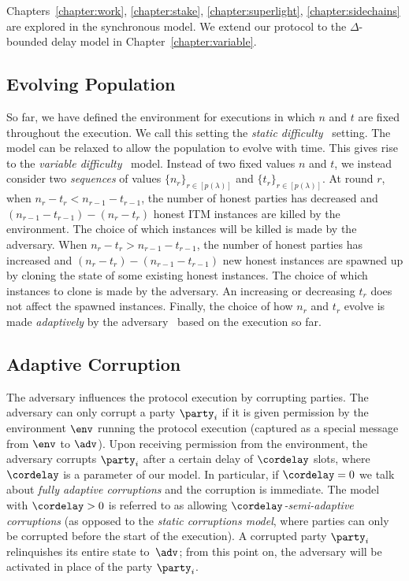 Chapters~\ref{chapter:work},
\ref{chapter:stake}, \ref{chapter:superlight}, \ref{chapter:sidechains} are
explored in the synchronous model. We extend our protocol to the $\Delta$-bounded
delay model in Chapter~\ref{chapter:variable}.

\subsection{Evolving Population}
So far, we have defined the environment for executions in which $n$ and $t$ are
fixed throughout the execution. We call this setting the
\emph{static difficulty}~\cite{backbone,backbone-new}
setting. The model can be relaxed to allow the population to evolve with time.
This gives rise to the
\emph{variable difficulty}~\cite{varbackbone}
model.
Instead of two fixed values $n$ and $t$, we instead consider two
\emph{sequences} of values
$\{n_r\}_{r \in [p(\lambda)]}$ and $\{t_r\}_{r \in [p(\lambda)]}$.
At round $r$, when $n_r - t_r < n_{r-1} - t_{r-1}$, the number of honest
parties has decreased and $(n_{r-1} - t_{r-1}) - (n_r - t_r)$ honest ITM
instances are killed by the environment. The choice of which instances will be
killed is made by the adversary. When
$n_r - t_r > n_{r-1} - t_{r-1}$, the number of honest parties has increased and
$(n_r - t_r) - (n_{r-1} - t_{r-1})$ new honest instances are spawned up by
cloning the state of some existing honest instances. The choice of which
instances to clone is made by the adversary. An increasing or decreasing $t_r$
does not affect the spawned instances. Finally, the choice of how $n_r$
and $t_r$ evolve is made \emph{adaptively} by the adversary~\cite{variable-new}
based on the execution so far.



\subsection{Adaptive Corruption}
\label{sec:prelim-corr}

The adversary influences the protocol execution by corrupting parties.
The adversary can only corrupt a party $\party_i$ if it is given
permission by the environment $\env$ running the protocol execution (captured as
a special message from $\env$ to $\adv$).
Upon receiving permission from the environment, the adversary
corrupts $\party_i$ after a certain delay of $\cordelay$ slots, where $\cordelay$ is
a parameter of our model. In particular, if $\cordelay=0$ we talk about
\emph{fully adaptive corruptions} and the corruption is immediate.
The model with $\cordelay>0$ is
referred to as allowing \emph{$\cordelay$-semi-adaptive corruptions} (as opposed to the
\emph{static corruptions model}, where parties can only be corrupted before the
start of the execution).
%
A corrupted
party $\party_i$ relinquishes its entire state to~$\adv$;
from this point on, the adversary will be activated in place of the
party $\party_i$.
